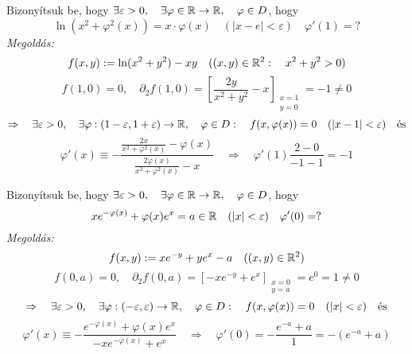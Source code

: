 \documentclass[a4paper,11.5pt]{article}
\begin{document}
			
	\begin{task}
		Bizonyítsuk be, hogy $\exists\varepsilon>0,\quad \exists\varphi\in\mathbb{R}\to\mathbb{R},\quad \varphi\in D$, hogy
		$$\ln(x^2+\varphi^2(x))=x\cdot \varphi(x)\quad (|x-e|<\varepsilon)\quad \varphi'(1)=?$$
		\textit{Megoldás:}
		\[ f(x,y):=\ln(x^2+y^2)-xy\quad ((x,y)\in\mathbb{R}^2:\quad x^2+y^2>0) \]
		\[ f(1,0)=0,\quad \partial_2f(1,0)=\left[\frac{2y}{x^2+y^2}-x\right]_{\substack{x=1\\y=0}}=-1\not=0 \]
		\[ \Rightarrow\quad \exists\varepsilon>0,\quad \exists\varphi:(1-\varepsilon,1+\varepsilon)\to\mathbb{R},\quad \varphi\in D:\quad f(x,\varphi(x))=0\quad (|x-1|<\varepsilon)\quad \text{és}\] \[\varphi'(x)\equiv-\frac{\frac{2x}{x^2+\varphi^2(x)}-\varphi(x)}{\frac{2\varphi(x)}{x^2+\varphi^2(x)}-x} \quad \Rightarrow\quad \varphi'(1)\frac{2-0}{-1-1}=-1 \]
	\end{task}
			
	\begin{task}
		Bizonyítsuk be, hogy $\exists\varepsilon>0,\quad \exists\varphi\in\mathbb{R}\to\mathbb{R},\quad \varphi\in D$, hogy
		$$ xe^{-\varphi(x)}+\varphi(x)e^x=a\in\mathbb{R}\quad (|x|<\varepsilon)\quad \varphi'(0)=?$$
		\textit{Megoldás:}
		\[ f(x,y):=xe^{-y}+ye^x-a\quad ((x,y)\in\mathbb{R}^2) \]
		\[ f(0,a)=0,\quad \partial_2f(0,a)=\left[-xe^{-y}+e^x\right]_{\substack{x=0\\y=a}}=e^0=1\not=0 \]
		\[ \Rightarrow\quad \exists\varepsilon>0,\quad \exists\varphi:(-\varepsilon,\varepsilon)\to\mathbb{R},\quad \varphi\in D:\quad f(x,\varphi(x))=0\quad (|x|<\varepsilon)\quad \text{és}\]
		\[\varphi'(x)\equiv -\frac{e^{-\varphi(x)}+\varphi(x)e^x}{-xe^{-\varphi(x)}+e^x} \quad  \Rightarrow\quad \varphi'(0)=-\frac{e^{-a}+a}{1}=-(e^{-a}+a) \]
	\end{task}
			
\end{document}
